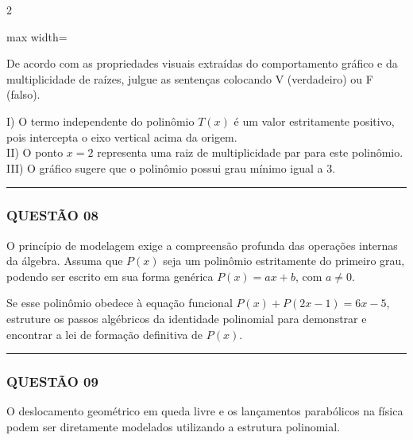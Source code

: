 \documentclass[twoside, 10pt, a4paper]{article}
\begin{document}
\begin{multicols*}{2}
\begin{center}
\begin{adjustbox}{max width=\linewidth}
\end{adjustbox}
\end{center}

De acordo com as propriedades visuais extraídas do comportamento gráfico e da multiplicidade de raízes, julgue as sentenças colocando V (verdadeiro) ou F (falso).

I) O termo independente do polinômio $ T(x) $ é um valor estritamente positivo, pois intercepta o eixo vertical acima da origem.\\[0.3cm]
II) O ponto $ x = 2 $ representa uma raiz de multiplicidade par para este polinômio.\\[0.3cm]
III) O gráfico sugere que o polinômio possui grau mínimo igual a 3.

\vspace{0cm} \noindent\textcolor{CorLinha}{\rule{\linewidth}{0.5pt}} \vspace{-0.2cm}
\subsubsection*{QUESTÃO 08}

O princípio de modelagem exige a compreensão profunda das operações internas da álgebra. Assuma que $ P(x) $ seja um polinômio estritamente do primeiro grau, podendo ser escrito em sua forma genérica $ P(x) = ax + b $, com $ a \neq 0 $.

Se esse polinômio obedece à equação funcional $ P(x) + P(2x - 1) = 6x - 5 $, estruture os passos algébricos da identidade polinomial para demonstrar e encontrar a lei de formação definitiva de $ P(x) $.

\vspace{0cm} \noindent\textcolor{CorLinha}{\rule{\linewidth}{0.5pt}} \vspace{-0.2cm}
\subsubsection*{QUESTÃO 09}

O deslocamento geométrico em queda livre e os lançamentos parabólicos na física podem ser diretamente modelados utilizando a estrutura polinomial. 


\end{multicols*}
\end{document}
